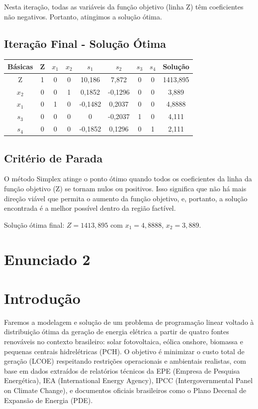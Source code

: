 \documentclass[12pt]{article}
\begin{document}
\noindent
Nesta iteração, todas as variáveis da função objetivo (linha Z) têm coeficientes não negativos. Portanto, atingimos a solução ótima.

\subsection*{Iteração Final - Solução Ótima}
\begin{center}
\renewcommand{\arraystretch}{1.3}
\begin{tabular}{c|ccccccc|c}
\textbf{Básicas} & Z & $x_1$ & $x_2$ & $s_1$ & $s_2$ & $s_3$ & $s_4$ & \textbf{Solução} \\
\hline
Z & 1  & 0 & 0 & 10{,}186 & 7{,}872 & 0 & 0 & 1413{,}895 \\
$x_2$ & 0 & 0 & 1 & 0{,}1852 & -0{,}1296 & 0 & 0 & 3{,}889 \\
$x_1$ & 0 & 1 & 0 & -0{,}1482 & 0{,}2037 & 0 & 0 & 4{,}8888 \\
$s_3$ & 0 & 0 & 0 & 0 & -0{,}2037 & 1 & 0 & 4{,}111 \\
$s_4$ & 0 & 0 & 0 & -0{,}1852 & 0{,}1296 & 0 & 1 & 2{,}111 \\
\end{tabular}
\end{center}

\subsection*{Critério de Parada}

O método Simplex atinge o ponto ótimo quando todos os coeficientes da linha da função objetivo (Z) se tornam nulos ou positivos. Isso significa que não há mais direção viável que permita o aumento da função objetivo, e, portanto, a solução encontrada é a melhor possível dentro da região factível.

\noindent
Solução ótima final: $\boxed{Z = 1413{,}895}$ com $x_1 = 4{,}8888$, $x_2 = 3{,}889$.


\section*{Enunciado 2}
\section*{Introdução}

Faremos a modelagem e solução de um problema de programação linear voltado à distribuição ótima da geração de energia elétrica a partir de quatro fontes renováveis no contexto brasileiro: solar fotovoltaica, eólica onshore, biomassa e pequenas centrais hidrelétricas (PCH). O objetivo é minimizar o custo total de geração (LCOE) respeitando restrições operacionais e ambientais realistas, com base em dados extraídos de relatórios técnicos da EPE (Empresa de Pesquisa Energética), IEA (International Energy Agency), IPCC (Intergovernmental Panel on Climate Change), e documentos oficiais brasileiros como o Plano Decenal de Expansão de Energia (PDE).
\end{document}
